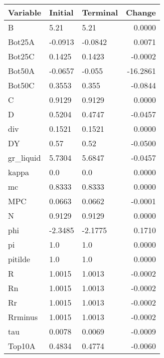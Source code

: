 \begin{table}
\centering
\label{tab:stst_comparison_slow_shock_limit_permanent}
\begin{tabular}{lllr}
\toprule
                Variable & Initial & Terminal &   Change \\
\midrule
                       B &    5.21 &     5.21 &   0.0000 \\
                  Bot25A & -0.0913 &  -0.0842 &   0.0071 \\
                  Bot25C &  0.1425 &   0.1423 &  -0.0002 \\
                  Bot50A & -0.0657 &   -0.055 & -16.2861 \\
                  Bot50C &  0.3553 &    0.355 &  -0.0844 \\
                       C &  0.9129 &   0.9129 &   0.0000 \\
                       D &  0.5204 &   0.4747 &  -0.0457 \\
                     div &  0.1521 &   0.1521 &   0.0000 \\
                      DY &    0.57 &     0.52 &  -0.0500 \\
               gr\_liquid &  5.7304 &   5.6847 &  -0.0457 \\
                   kappa &     0.0 &      0.0 &   0.0000 \\
                      mc &  0.8333 &   0.8333 &   0.0000 \\
                     MPC &  0.0663 &   0.0662 &  -0.0001 \\
                       N &  0.9129 &   0.9129 &   0.0000 \\
                     phi & -2.3485 &  -2.1775 &   0.1710 \\
                      pi &     1.0 &      1.0 &   0.0000 \\
                 pitilde &     1.0 &      1.0 &   0.0000 \\
                       R &  1.0015 &   1.0013 &  -0.0002 \\
                      Rn &  1.0015 &   1.0013 &  -0.0002 \\
                      Rr &  1.0015 &   1.0013 &  -0.0002 \\
                 Rrminus &  1.0015 &   1.0013 &  -0.0002 \\
                     tau &  0.0078 &   0.0069 &  -0.0009 \\
                  Top10A &  0.4834 &   0.4774 &  -0.0060 \\

\end{tabular}
\end{table}
